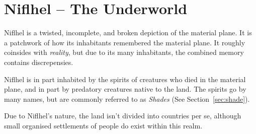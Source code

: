\section{Niflhel -- The Underworld}
Niflhel is a twisted, incomplete, and broken depiction of the material plane.
It is a patchwork of how its inhabitants remembered the material plane.
It roughly coinsides with \textit{reality}, but due to its many inhabitants, the combined memory contains discrepensies.

Niflhel is in part inhabited by the spirits of creatures who died in the material plane, and in part by predatory creatures native to the land.
The spirits go by many names, but are commonly referred to as \textit{Shades} (See Section~\ref{sec:shade}).

Due to Niflhel's nature, the land isn't divided into countries per se, although small organised settlements of people do exist within this realm.